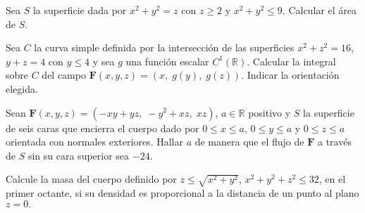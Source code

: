 
\begin{question}
    Sea  $S$  la superficie dada por $x^{2}+ y^{2} = z$ con $z \geq 2$  y $x^{2}+ y^{2} \leq 9.$  Calcular el \'area de $S.$
\end{question}


\begin{question}
    Sea $C$ la curva simple definida por la intersecci\'on de las superficies $x^{2}+z^{2}=16$,  $y+z=4$ con $y\leq 4$ y sea $g$ una funci\'on escalar $C^{1}(\mathbb{R})$. Calcular la integral sobre $C$ del campo $\mathbf{F}(x,y,z)=(x,\;g(y),\;g(z)).$ Indicar la orientaci\'on elegida. 
\end{question}


\begin{question}
    Sean $\mathbf{F}(x,y,z)=(-xy+yz,\;-y^{2}+xz,\; xz)$, $a \in \mathbb{R}$ positivo  y $S$ la superficie de seis caras que encierra el cuerpo dado por $0\leq x \leq  a$, $0 \leq  y \leq  a $ y  $0 \leq  z \leq a$ orientada con normales exteriores.   Hallar $a$ de manera que el flujo de $\mathbf{F}$ a trav\'es  de $S$ sin su cara superior sea $-24$. 
\end{question}


\begin{question}  
    Calcule la masa del cuerpo definido por $z\leq \sqrt{x^{2} + y^{2} }$,  $x^{2} + y^{2} + z^{2} \leq 32$,  en el primer octante, si su densidad es proporcional a la distancia de un  punto al plano $z=0.$  
\end{question}

\newpage


